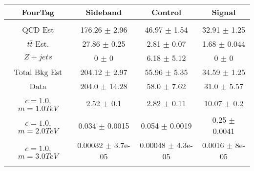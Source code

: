 \begin{footnotesize} 
\begin{tabular}{c|c|c|c} 
FourTag & Sideband & Control & Signal \\ 
\hline\hline 
& & & \\ 
QCD Est & 176.26 $\pm$ 2.96 & 46.97 $\pm$ 1.54 & 32.91 $\pm$ 1.25\\ 
$t\bar{t}$ Est.  & 27.86 $\pm$ 0.25 & 2.81 $\pm$ 0.07 & 1.68 $\pm$ 0.044\\ 
$Z+jets$ & 0 $\pm$ 0 & 6.18 $\pm$ 5.12 & 0 $\pm$ 0\\ 
Total Bkg Est & 204.12 $\pm$ 2.97 & 55.96 $\pm$ 5.35 & 34.59 $\pm$ 1.25\\ 
Data & 204.0 $\pm$ 14.28 & 58.0 $\pm$ 7.62 & 31.0 $\pm$ 5.57\\ 
$c=1.0$,$m=1.0TeV$ & 2.52 $\pm$ 0.1 & 2.82 $\pm$ 0.11 & 10.07 $\pm$ 0.2\\ 
$c=1.0$,$m=2.0TeV$ & 0.034 $\pm$ 0.0015 & 0.054 $\pm$ 0.0019 & 0.25 $\pm$ 0.0041\\ 
$c=1.0$,$m=3.0TeV$ & 0.00032 $\pm$ 3.7e-05 & 0.00048 $\pm$ 4.3e-05 & 0.0016 $\pm$ 8e-05\\ 
& & & \\ 
\hline\hline 
\end{tabular} 
\end{footnotesize} 
\newline 
